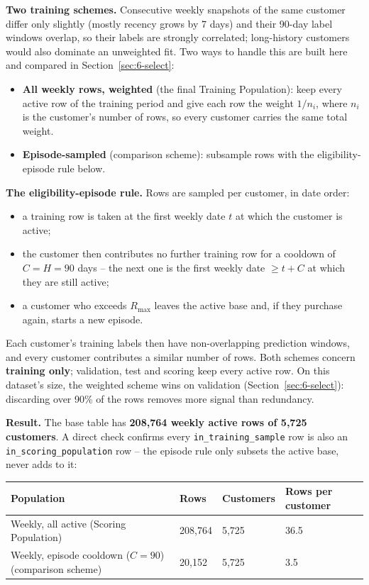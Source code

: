 \textbf{Two training schemes.} Consecutive weekly snapshots of the same customer differ only slightly (mostly recency grows by 7 days) and their 90-day label windows overlap, so their labels are strongly correlated; long-history customers would also dominate an unweighted fit. Two ways to handle this are built here and compared in Section~\ref{sec:6-select}:
\begin{itemize}
    \item \textbf{All weekly rows, weighted} (the final Training Population): keep every active row of the training period and give each row the weight $1/n_i$, where $n_i$ is the customer's number of rows, so every customer carries the same total weight.
    \item \textbf{Episode-sampled} (comparison scheme): subsample rows with the eligibility-episode rule below.
\end{itemize}

\textbf{The eligibility-episode rule.} Rows are sampled per customer, in date order:
\begin{itemize}
    \item a training row is taken at the first weekly date $t$ at which the customer is active;
    \item the customer then contributes no further training row for a cooldown of $C = H = 90$ days -- the next one is the first weekly date $\geq t + C$ at which they are still active;
    \item a customer who exceeds $R_{\max}$ leaves the active base and, if they purchase again, starts a new episode.
\end{itemize}
Each customer's training labels then have non-overlapping prediction windows, and every customer contributes a similar number of rows. Both schemes concern \textbf{training only}; validation, test and scoring keep every active row. On this dataset's size, the weighted scheme wins on validation (Section~\ref{sec:6-select}): discarding over 90\% of the rows removes more signal than redundancy.

\textbf{Result.} The base table has \textbf{208,764 weekly active rows of 5,725 customers}. A direct check confirms every \texttt{in\_training\_sample} row is also an \texttt{in\_scoring\_population} row -- the episode rule only subsets the active base, never adds to it:

\begin{center}
\begin{tabular}{@{}p{6.4cm}p{2.4cm}p{2.4cm}p{2.8cm}@{}}
    \toprule
    Population & Rows & Customers & Rows per customer \\
    \midrule
    Weekly, all active (Scoring Population) & 208,764 & 5,725 & 36.5 \\
    Weekly, episode cooldown ($C = 90$) (comparison scheme) & 20,152 & 5,725 & 3.5 \\
    \bottomrule
\end{tabular}
\end{center}

